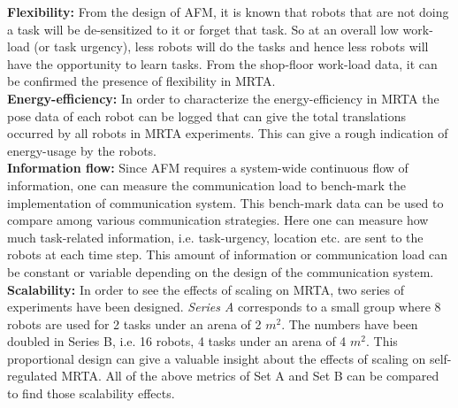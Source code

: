 \textbf{Flexibility:} From the design of AFM, it is known that robots that are not doing a task will be de-sensitized to it or forget that task. So at an overall low work-load (or task urgency), less robots will do the tasks and hence less robots will have the opportunity to learn tasks. From the shop-floor work-load data, it can be confirmed the presence of flexibility in MRTA.\\
\textbf{Energy-efficiency:} In order to characterize the energy-efficiency in MRTA  the pose data of each robot can be logged that can give the total translations occurred by all robots in MRTA experiments. This can give a rough indication of energy-usage by the robots. \\
\textbf{Information flow:} Since AFM requires a system-wide continuous flow of information, one can measure the communication load to bench-mark the implementation of communication system. This bench-mark data can be used to compare among various communication strategies. Here one can measure  how much task-related information, i.e. task-urgency, location etc. are sent to the robots at each time step. This  amount of information or communication load can be constant or variable depending on the design of the communication system.\\
\textbf{Scalability:} In order to see the effects of scaling on MRTA, two series of experiments have been designed. {\em Series A} corresponds to a small group where  8 robots are used for 2 tasks under an arena of 2 $m^2$. The numbers have been doubled in {Series B}, i.e. 16 robots, 4 tasks under an arena of 4 $m^2$. This proportional design can give a valuable insight about the effects of scaling on self-regulated MRTA. All of the above metrics of Set A and Set B can be compared to find those scalability effects.

